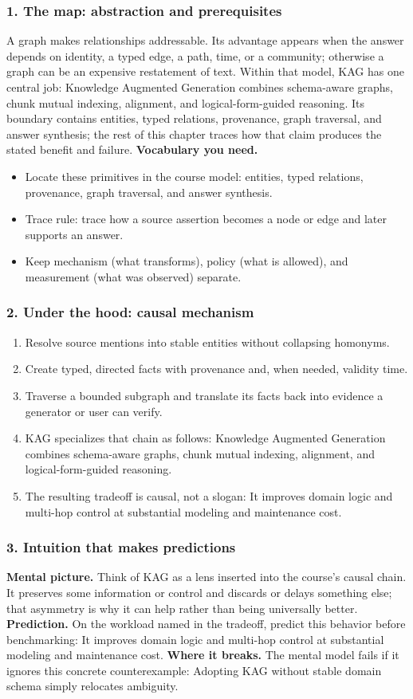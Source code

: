 \subsubsection*{1. The map: abstraction and prerequisites}
A graph makes relationships addressable. Its advantage appears when the answer depends on identity, a typed edge, a path, time, or a community; otherwise a graph can be an expensive restatement of text.
Within that model, KAG has one central job: Knowledge Augmented Generation combines schema-aware graphs, chunk mutual indexing, alignment, and logical-form-guided reasoning. Its boundary contains entities, typed relations, provenance, graph traversal, and answer synthesis; the rest of this chapter traces how that claim produces the stated benefit and failure.
\textbf{Vocabulary you need.}\begin{itemize}
\item Locate these primitives in the course model: entities, typed relations, provenance, graph traversal, and answer synthesis.
\item Trace rule: trace how a source assertion becomes a node or edge and later supports an answer.
\item Keep mechanism (what transforms), policy (what is allowed), and measurement (what was observed) separate.
\end{itemize}
\subsubsection*{2. Under the hood: causal mechanism}\begin{enumerate}
\item Resolve source mentions into stable entities without collapsing homonyms.
\item Create typed, directed facts with provenance and, when needed, validity time.
\item Traverse a bounded subgraph and translate its facts back into evidence a generator or user can verify.
\item KAG specializes that chain as follows: Knowledge Augmented Generation combines schema-aware graphs, chunk mutual indexing, alignment, and logical-form-guided reasoning.
\item The resulting tradeoff is causal, not a slogan: It improves domain logic and multi-hop control at substantial modeling and maintenance cost.
\end{enumerate}
\subsubsection*{3. Intuition that makes predictions}
\textbf{Mental picture.} Think of KAG as a lens inserted into the course's causal chain. It preserves some information or control and discards or delays something else; that asymmetry is why it can help rather than being universally better.
\textbf{Prediction.} On the workload named in the tradeoff, predict this behavior before benchmarking: It improves domain logic and multi-hop control at substantial modeling and maintenance cost.
\textbf{Where it breaks.} The mental model fails if it ignores this concrete counterexample: Adopting KAG without stable domain schema simply relocates ambiguity.
